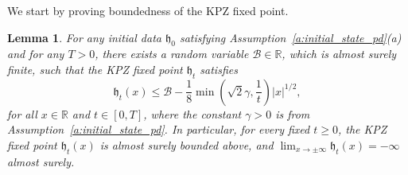 \documentclass[oneside,final,11pt]{amsart}
\newtheorem{lem}[thm]{Lemma}
\theoremstyle{definition}
\newcommand{\fh}{\mathfrak{h}}
\newcommand{\R}{\mathbb{R}}
\newcommand{\CB}{\mathcal{B}}
\newcommand{\1}[1]{\mathbf{1}_{#1}}
\numberwithin{equation}{section}
\begin{document}
We start by proving boundedness of the KPZ fixed point.

\begin{lem}\label{lem:KPZ_is_bounded}
For any initial data $\fh_0$ satisfying Assumption~\ref{a:initial_state_pd}(a) and for any $T > 0$, there exists a random variable $\CB \in \R$, which is almost surely finite, such that the KPZ fixed point $\fh_{t}$ satisfies
%
\begin{equation}\label{eq:KPZ_is_bounded}
  \fh_t(x) \leq \CB - \frac{1}{8}\min\left(\sqrt{2}\gamma, \frac{1}{t}\right) |x|^{1/2},
\end{equation}
%
for all $x \in \R$ and $t \in [0, T]$, where the constant $\gamma > 0$ is from Assumption~\ref{a:initial_state_pd}. In particular, for every fixed $t \geq 0$, the KPZ fixed point $\fh_t(x)$ is almost surely bounded  above, and $\lim_{x \to \pm \infty} \fh_t(x) = -\infty$ almost surely.
\end{lem}
\end{document}
